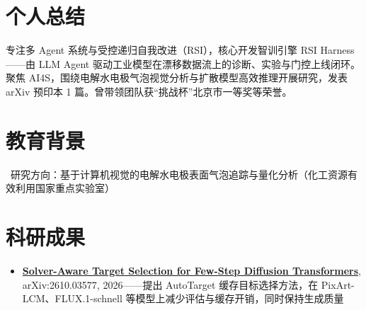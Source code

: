 \documentclass{resume}
\begin{document}



\section{个人总结}
专注多 Agent 系统与受控递归自我改进（RSI），核心开发智训引擎 RSI Harness——由 LLM Agent 驱动工业模型在漂移数据流上的诊断、实验与门控上线闭环。聚焦 AI4S，围绕电解水电极气泡视觉分析与扩散模型高效推理开展研究，发表 arXiv 预印本 1 篇。曾带领团队获“挑战杯”北京市一等奖等荣誉。

\section{教育背景}
\ 研究方向：基于计算机视觉的电解水电极表面气泡追踪与量化分析（化工资源有效利用国家重点实验室）

\section{科研成果}
\begin{itemize}[parsep=0.05ex]
  \item \textbf{\href{https://arxiv.org/abs/2610.03577}{Solver-Aware Target Selection for Few-Step Diffusion Transformers}}, arXiv:2610.03577, 2026——提出 AutoTarget 缓存目标选择方法，在 PixArt-LCM、FLUX.1-schnell 等模型上减少评估与缓存开销，同时保持生成质量
\end{itemize}

\end{document}
